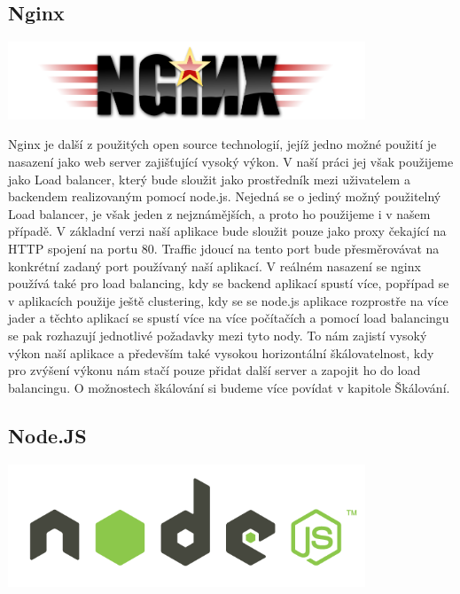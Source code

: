 \documentclass[thesis=M,czech]{FITthesis}[2012/06/26]
\begin{document}
\subsection{Nginx}

\includegraphics[width=0.8\textwidth]{images/logo_nginx}

Nginx je další z použitých open source technologií, jejíž jedno možné použití je nasazení jako web server zajišťující vysoký výkon. V naší práci jej však použijeme jako Load balancer, který bude sloužit jako prostředník mezi uživatelem a backendem realizovaným pomocí node.js. Nejedná se o jediný možný použitelný Load balancer, je však jeden z nejznámějších, a proto ho použijeme i v našem případě.
V základní verzi naší aplikace bude sloužit pouze jako proxy čekající na HTTP spojení na portu 80. Traffic jdoucí na tento port bude přesměrovávat na konkrétní zadaný port používaný naší aplikací. V reálném nasazení se nginx používá také pro load balancing, kdy se backend aplikací spustí více, popřípad se v aplikacích použije ještě clustering, kdy se se node.js aplikace rozprostře na více jader a těchto aplikací se spustí více na více počítačích a pomocí load balancingu se pak rozhazují jednotlivé požadavky mezi tyto nody. To nám zajistí vysoký výkon naší aplikace a především také vysokou horizontální škálovatelnost, kdy pro zvýšení výkonu nám stačí pouze přidat další server a zapojit ho do load balancingu. O možnostech škálování si budeme více povídat v kapitole Škálování.

\subsection{Node.JS}

\includegraphics[width=0.8\textwidth]{images/logo_nodejs}
\end{document}

